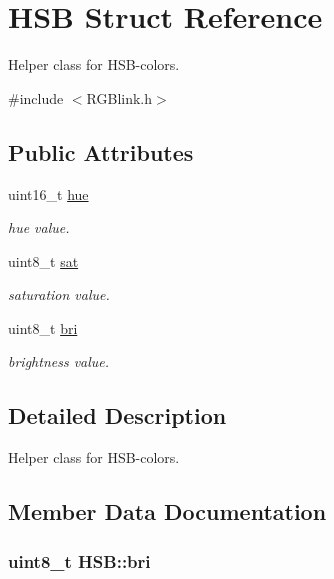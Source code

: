 \hypertarget{struct_h_s_b}{\section{H\-S\-B Struct Reference}
\label{struct_h_s_b}
}


Helper class for H\-S\-B-\/colors.  




{\ttfamily \#include $<$R\-G\-Blink.\-h$>$}

\subsection*{Public Attributes}
\begin{DoxyCompactItemize}
\item 
uint16\-\_\-t \hyperlink{struct_h_s_b_a97e44b31b1532aa71becd8be2b371312}{hue}
\begin{DoxyCompactList}\small\item\em hue value. \end{DoxyCompactList}\item 
uint8\-\_\-t \hyperlink{struct_h_s_b_aa0f19da1a643bb8bbb52d23513c314c4}{sat}
\begin{DoxyCompactList}\small\item\em saturation value. \end{DoxyCompactList}\item 
uint8\-\_\-t \hyperlink{struct_h_s_b_a4bfe2588fe579cb5b021420d1d9dadf1}{bri}
\begin{DoxyCompactList}\small\item\em brightness value. \end{DoxyCompactList}\end{DoxyCompactItemize}


\subsection{Detailed Description}
Helper class for H\-S\-B-\/colors. 

\subsection{Member Data Documentation}
\hypertarget{struct_h_s_b_a4bfe2588fe579cb5b021420d1d9dadf1}{
\subsubsection[{bri}]{\setlength{\rightskip}{0pt plus 5cm}uint8\-\_\-t H\-S\-B\-::bri}}\label{struct_h_s_b_a4bfe2588fe579cb5b021420d1d9dadf1}


